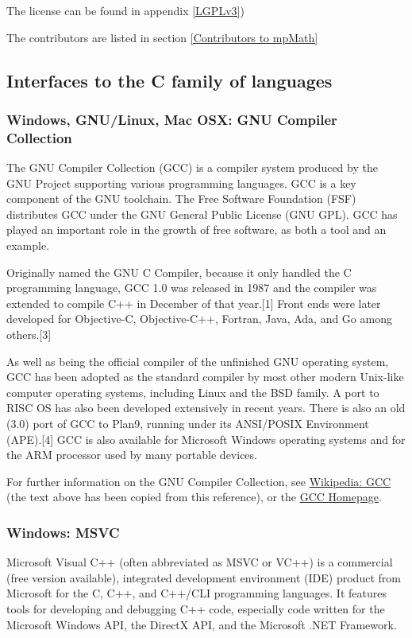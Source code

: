 \vpara
The license can be found in appendix \ref{LGPLv3})

The contributors are listed in section \ref{Contributors to mpMath}





\subsection{Interfaces to the C family of languages}

\subsubsection{Windows, GNU/Linux, Mac OSX: GNU Compiler Collection}
The GNU Compiler Collection (GCC) is a compiler system produced by the GNU Project supporting various programming languages. GCC is a key component of the GNU toolchain. The Free Software Foundation (FSF) distributes GCC under the GNU General Public License (GNU GPL). GCC has played an important role in the growth of free software, as both a tool and an example.

\vpara
Originally named the GNU C Compiler, because it only handled the C programming language, GCC 1.0 was released in 1987 and the compiler was extended to compile C++ in December of that year.[1] Front ends were later developed for Objective-C, Objective-C++, Fortran, Java, Ada, and Go among others.[3]

\vpara
As well as being the official compiler of the unfinished GNU operating system, GCC has been adopted as the standard compiler by most other modern Unix-like computer operating systems, including Linux and the BSD family. A port to RISC OS has also been developed extensively in recent years. There is also an old (3.0) port of GCC to Plan9, running under its ANSI/POSIX Environment (APE).[4] GCC is also available for Microsoft Windows operating systems and for the ARM processor used by many portable devices.

\vpara
For further information on the GNU Compiler Collection, see \href{http://en.wikipedia.org/wiki/GNU_Compiler_Collection}{Wikipedia: GCC} (the text above has been copied from this reference), or the  \href{http://gcc.gnu.org/}{GCC Homepage}.


\subsubsection{Windows: MSVC}
Microsoft Visual C++ (often abbreviated as MSVC or VC++) is a commercial (free version available), integrated development environment (IDE) product from Microsoft for the C, C++, and C++/CLI programming languages. It features tools for developing and debugging C++ code, especially code written for the Microsoft Windows API, the DirectX API, and the Microsoft .NET Framework.

